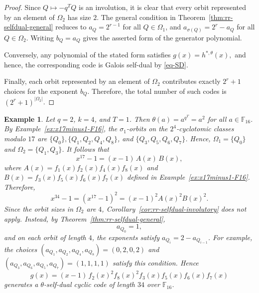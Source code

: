 \documentclass[pdflatex,sn-mathphys-num]{sn-jnl}%
\theoremstyle{thmstyleone}%
\theoremstyle{thmstyletwo}%
\newtheorem{example}{Example}%
\theoremstyle{thmstylethree}%
\newcommand{\F}{\mathbb{F}}
\begin{document}
\begin{proof} Since  $
Q\mapsto -q^TQ
$
is an involution, it is clear that 
 every orbit represented by an element of $\Omega_2$ has size $2$. The general condition in Theorem~\ref{thm:rr-selfdual-general} reduces to $
a_Q=2^{r-1} $ for all $Q\in\Omega_1$,
and $
a_{\sigma(Q)}=2^r-a_Q
 $ for all $Q\in\Omega_2$.
Writing $b_Q=a_Q$ gives the asserted form of the generator polynomial.

Conversely, any polynomial of the stated form satisfies
$
g(x)=h^{\ast,\theta}(x),
$
and hence, the corresponding code is Galois self-dual by \eqref{eq-SD}.

Finally, each orbit represented by an element of $\Omega_2$ contributes exactly $2^r+1$ choices for the exponent $b_Q$. Therefore, the total number of such codes is $
(2^r+1)^{|\Omega_2|}$.
\end{proof}

\begin{example}\label{ex:theta-selfdual-34-T1}
Let $q=2$, $k=4$, and $T=1$. Then $
\theta(a)=a^{q^T}=a^2
$ for all $ a\in \F_{16}$.
By Example~\ref{ex:x17minus1-F16}, the $\sigma_1$-orbits on the $2^4$-cyclotomic classes modulo $17$ are
$
\{Q_0\}, \{Q_1,Q_2,Q_4,Q_8\}$, and $ \{Q_3,Q_5,Q_6,Q_7\}$.
Hence, $
\Omega_1=\{Q_0\}$ and $
\Omega_2=\{Q_1,Q_3\}$. It follows that 
\[
x^{17}-1=(x-1)\,A(x)\,B(x),
\]
where
$
A(x)=f_1(x)f_2(x)f_4(x)f_8(x)$ and $ 
B(x)=f_3(x)f_5(x)f_6(x)f_7(x)$ defined in Example~\ref{ex:x17minus1-F16}.
Therefore,
\[
x^{34}-1=(x^{17}-1)^2=(x-1)^2A(x)^2B(x)^2.
\]
Since the orbit sizes in $\Omega_2$ are $4$, Corollary~\ref{cor:rr-selfdual-involutory} does not apply. Instead, by Theorem~\ref{thm:rr-selfdual-general},
\[
a_{Q_0}=1,
\]
and on each orbit of length $4$, the exponents satisfy
$
a_{Q_i}=2-a_{Q_{i-1}}$.
For example, the choices
$
(a_{Q_1},a_{Q_2},a_{Q_4},a_{Q_8})=(0,2,0,2)
$
and
$
(a_{Q_3},a_{Q_6},a_{Q_5},a_{Q_7})=(1,1,1,1)
$
satisfy this condition. Hence
\[
g(x)=(x-1)\,f_2(x)^2f_8(x)^2f_3(x)f_5(x)f_6(x)f_7(x)
\]
generates a $\theta$-self-dual cyclic code of length $34$ over $\F_{16}$.
\end{example}
\end{document}
